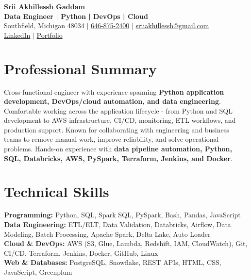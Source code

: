 \documentclass[letterpaper,10pt]{article}
\begin{document}
\fontsize{9.35pt}{10.45pt}\selectfont

\begin{center}
    {\LARGE \textbf{Srii Akhillessh Gaddam}} \\[-1pt]
    \textbf{Data Engineer | Python | DevOps | Cloud} \\[2pt]
    Southfield, Michigan 48034 $|$
    \href{tel:6468752400}{646-875-2400} $|$
    \href{mailto:sriiakhillessh@gmail.com}{sriiakhillessh@gmail.com} \\[1pt]
    \href{https://www.linkedin.com/in/srii-akhiilessh-gaddam-b48668191/}{LinkedIn} $|$
    \href{https://sriiakhillesshg.github.io/portfolio/}{Portfolio}
\end{center}
\vspace{-8pt}

\section{Professional Summary}
\small{Cross-functional engineer with experience spanning \textbf{Python application development, DevOps/cloud automation, and data engineering}. Comfortable working across the application lifecycle - from Python and SQL development to AWS infrastructure, CI/CD, monitoring, ETL workflows, and production support. Known for collaborating with engineering and business teams to remove manual work, improve reliability, and solve operational problems. Hands-on experience with \textbf{data pipeline automation, Python, SQL, Databricks, AWS, PySpark, Terraform, Jenkins, and Docker}.}

\section{Technical Skills}
\small{
\textbf{Programming:} Python, SQL, Spark SQL, PySpark, Bash, Pandas, JavaScript \\
\textbf{Data Engineering:} ETL/ELT, Data Validation, Databricks, Airflow, Data Modeling, Batch Processing, Apache Spark, Delta Lake, Auto Loader \\
\textbf{Cloud \& DevOps:} AWS (S3, Glue, Lambda, Redshift, IAM, CloudWatch), Git, CI/CD, Terraform, Jenkins, Docker, GitHub, Linux \\
\textbf{Web \& Databases:} PostgreSQL, Snowflake, REST APIs, HTML, CSS, JavaScript, Greenplum
}
\end{document}

